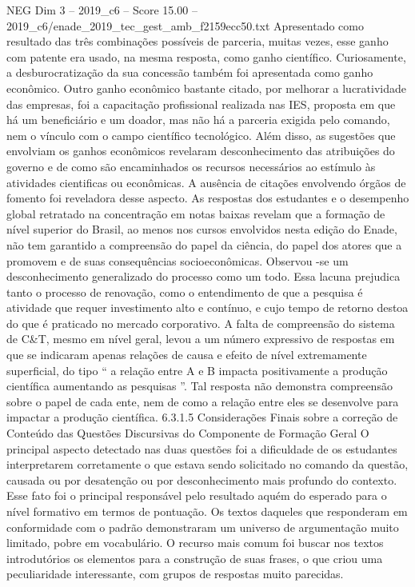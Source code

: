 \begin{textsample}{NEG Dim 3 – 2019\_c6 – Score 15.00 – 2019\_c6/enade\_2019\_tec\_gest\_amb\_f2159ecc50.txt}
Apresentado como resultado das três combinações possíveis de parceria, muitas vezes, esse ganho com patente era usado, na mesma resposta, como ganho científico.
Curiosamente, a desburocratização da sua concessão também foi apresentada como ganho econômico.
Outro ganho econômico bastante citado, por melhorar a lucratividade das empresas, foi a capacitação profissional realizada nas IES, proposta em que há um beneficiário e um doador, mas não há a parceria exigida pelo comando, nem o vínculo com o campo científico tecnológico.
Além disso, as sugestões que envolviam os ganhos econômicos revelaram desconhecimento das atribuições do governo e de como são encaminhados os recursos necessários ao estímulo às atividades cientificas ou econômicas.
A ausência de citações envolvendo órgãos de fomento foi reveladora desse aspecto.
As respostas dos estudantes e o desempenho global retratado na concentração em notas baixas revelam que a formação de nível superior do Brasil, ao menos nos cursos envolvidos nesta edição do Enade, não tem garantido a compreensão do papel da ciência, do papel dos atores que a promovem e de suas consequências socioeconômicas.
Observou -se um desconhecimento generalizado do processo como um todo.
Essa lacuna prejudica tanto o processo de renovação, como o entendimento de que a pesquisa é atividade que requer investimento alto e contínuo, e cujo tempo de retorno destoa do que é praticado no mercado corporativo.
A falta de compreensão do sistema de C\&T, mesmo em nível geral, levou a um número expressivo de respostas em que se indicaram apenas relações de causa e efeito de nível extremamente superficial, do tipo “ a relação entre A e B impacta positivamente a produção científica aumentando as pesquisas ”.
Tal resposta não demonstra compreensão sobre o papel de cada ente, nem de como a relação entre eles se desenvolve para impactar a produção científica. 6.3.1.5 Considerações Finais sobre a correção de Conteúdo das Questões Discursivas do Componente de Formação Geral O principal aspecto detectado nas duas questões foi a dificuldade de os estudantes interpretarem corretamente o que estava sendo solicitado no comando da questão, causada ou por desatenção ou por desconhecimento mais profundo do contexto.
Esse fato foi o principal responsável pelo resultado aquém do esperado para o nível formativo em termos de pontuação.
Os textos daqueles que responderam em conformidade com o padrão demonstraram um universo de argumentação muito limitado, pobre em vocabulário.
O recurso mais comum foi buscar nos textos introdutórios os elementos para a construção de suas frases, o que criou uma peculiaridade interessante, com grupos de respostas muito parecidas.

\end{textsample}
